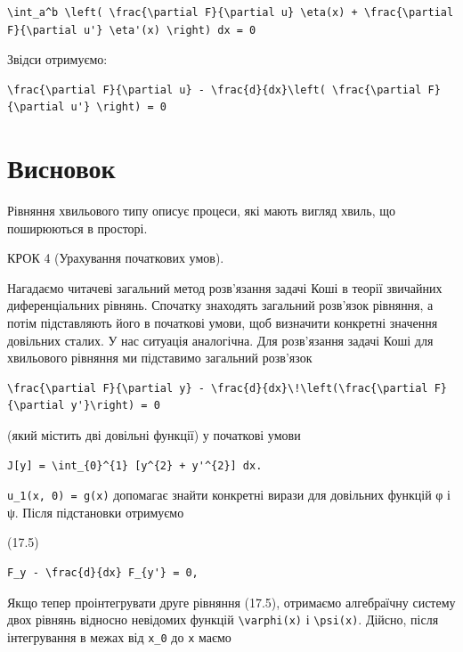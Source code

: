 \documentclass[
  ukrainian,
]{article}
\begin{document}
\begin{verbatim}
\int_a^b \left( \frac{\partial F}{\partial u} \eta(x) + \frac{\partial F}{\partial u'} \eta'(x) \right) dx = 0
\end{verbatim}

Звідси отримуємо:

\begin{verbatim}
\frac{\partial F}{\partial u} - \frac{d}{dx}\left( \frac{\partial F}{\partial u'} \right) = 0
\end{verbatim}

\section{Висновок}\label{ux432ux438ux441ux43dux43eux432ux43eux43a-1}

Рівняння хвильового типу описує процеси, які мають вигляд хвиль, що
поширюються в просторі.

КРОК 4 (Урахування початкових умов).

Нагадаємо читачеві загальний метод розв'язання задачі Коші в теорії
звичайних диференціальних рівнянь. Спочатку знаходять загальний
розв'язок рівняння, а потім підставляють його в початкові умови, щоб
визначити конкретні значення довільних сталих. У нас ситуація
аналогічна. Для розв'язання задачі Коші для хвильового рівняння ми
підставимо загальний розв'язок

\begin{verbatim}
\frac{\partial F}{\partial y} - \frac{d}{dx}\!\left(\frac{\partial F}{\partial y'}\right) = 0
\end{verbatim}

(який містить дві довільні функції) у початкові умови

\begin{verbatim}
J[y] = \int_{0}^{1} [y^{2} + y'^{2}] dx.
\end{verbatim}

\texttt{u\_1(x,\ 0)\ =\ g(x)} допомагає знайти конкретні вирази для
довільних функцій φ і ψ. Після підстановки отримуємо

(17.5)

\begin{verbatim}
F_y - \frac{d}{dx} F_{y'} = 0,
\end{verbatim}

Якщо тепер проінтегрувати друге рівняння (17.5), отримаємо алгебраїчну
систему двох рівнянь відносно невідомих функцій
\texttt{\textbackslash{}varphi(x)} і \texttt{\textbackslash{}psi(x)}.
Дійсно, після інтегрування в межах від \texttt{x\_0} до \texttt{x} маємо
\end{document}
